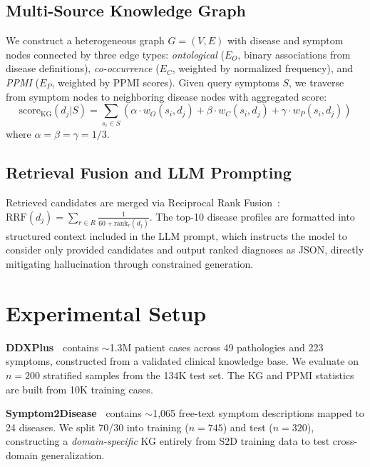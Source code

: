 \documentclass[preprint,12pt]{elsarticle}
\begin{document}
\subsection{Multi-Source Knowledge Graph}

We construct a heterogeneous graph $G = (V, E)$ with disease and symptom nodes connected by three edge types: \emph{ontological} ($E_O$, binary associations from disease definitions), \emph{co-occurrence} ($E_C$, weighted by normalized frequency), and \emph{PPMI} ($E_P$, weighted by PPMI scores). Given query symptoms $S$, we traverse from symptom nodes to neighboring disease nodes with aggregated score:
\begin{equation}
    \text{score}_{\text{KG}}(d_j | S) = \sum_{s_i \in S} \left(\alpha \cdot w_O(s_i, d_j) + \beta \cdot w_C(s_i, d_j) + \gamma \cdot w_P(s_i, d_j)\right)
\end{equation}
where $\alpha = \beta = \gamma = 1/3$.

\subsection{Retrieval Fusion and LLM Prompting}

Retrieved candidates are merged via Reciprocal Rank Fusion~\cite{cormack2009reciprocal}: $\text{RRF}(d_j) = \sum_{r \in R} \frac{1}{60 + \text{rank}_r(d_j)}$. The top-10 disease profiles are formatted into structured context included in the LLM prompt, which instructs the model to consider only provided candidates and output ranked diagnoses as JSON, directly mitigating hallucination through constrained generation.

\section{Experimental Setup}
\label{sec:experiments}

\textbf{DDXPlus~\cite{fansi2022ddxplus}} contains ${\sim}$1.3M patient cases across 49 pathologies and 223 symptoms, constructed from a validated clinical knowledge base. We evaluate on $n{=}200$ stratified samples from the 134K test set. The KG and PPMI statistics are built from 10K training cases.

\textbf{Symptom2Disease~\cite{gretelai_s2d}} contains ${\sim}$1,065 free-text symptom descriptions mapped to 24 diseases. We split 70/30 into training ($n{=}745$) and test ($n{=}320$), constructing a \emph{domain-specific} KG entirely from S2D training data to test cross-domain generalization.
\end{document}
